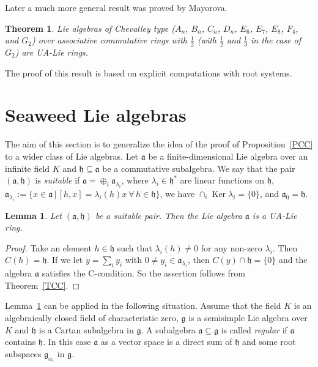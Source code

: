 \documentclass[a4paper,draft,reqno,12pt]{amsart}
\newtheorem{lemma}{Lemma}
\newtheorem{theorem}{Theorem}
\theoremstyle{definition}
\theoremstyle{remark}
\DeclareMathOperator{\Ker}{Ker}
\def\ggg{\mathfrak{g}}
\def\hhh{\mathfrak{h}}
\def\aaa{\mathfrak{a}}
\begin{document}
Later a much more general result was proved by Mayorova. 

\begin{theorem} \cite[Theorem~6]{Ma}
Lie algebras of Chevalley type ($A_n$, $B_n$, $C_n$, $D_n$, $E_6$, $E_7$, $E_8$, $F_4$, and
$G_2$) over associative commutative rings with $\frac{1}{2}$ (with $\frac{1}{2}$ and $\frac{1}{3}$
in the case of $G_2$) are UA-Lie rings.
\end{theorem} 

The proof of this result is based on explicit computations with root systems.

\section{Seaweed Lie algebras} 
\label{sw}

The aim of this section is to generalize the idea of the proof of Proposition~\ref{PCC} to a wider class of Lie algebras. Let $\aaa$ be a finite-dimensional Lie algebra over an infinite field $K$ 
and $\hhh\subseteq\aaa$ be a commutative subalgebra. We say that the pair $(\aaa,\hhh)$ is \emph{suitable} if $\aaa=\oplus_{i}\aaa_{\lambda_i}$, where $\lambda_i\in\hhh^*$ are linear functions on $\hhh$, $\aaa_{\lambda_i}:=\{x\in\aaa \, | \, [h,x]=\lambda_i(h)x \ \forall \, h\in\hhh\}$, we have $\cap_i\Ker\lambda_i=\{0\}$, and $\aaa_0=\hhh$. 

\begin{lemma}
\label{suit}
Let $(\aaa,\hhh)$ be a suitable pair. Then the Lie algebra $\aaa$ is a UA-Lie ring.
\end{lemma}

\begin{proof}
Take an element $h\in\hhh$ such that $\lambda_i(h)\ne 0$ for any non-zero $\lambda_i$. Then $C(h)=\hhh$.  If we let $y=\sum_i y_i$ with $0\ne y_i\in\aaa_{\lambda_i}$, then
$C(y)\cap\hhh=\{0\}$ and the algebra $\aaa$ satisfies the C-condition. So the assertion follows from Theorem~\ref{TCC}. 
\end{proof}

\medskip

Lemma~\ref{suit} can be applied in the following situation. Assume that the field $K$ is an algebraically closed field of characteristic zero, $\ggg$ is a semisimple Lie algebra over $K$ and 
$\hhh$ is a Cartan subalgebra in $\ggg$. A subalgebra $\aaa\subseteq\ggg$ is called \emph{regular} if $\aaa$ contains $\hhh$. In this case $\aaa$ as a vector space is a direct sum of $\hhh$
and some root subspaces $\ggg_{\alpha_i}$ in $\ggg$. 
\end{document}

